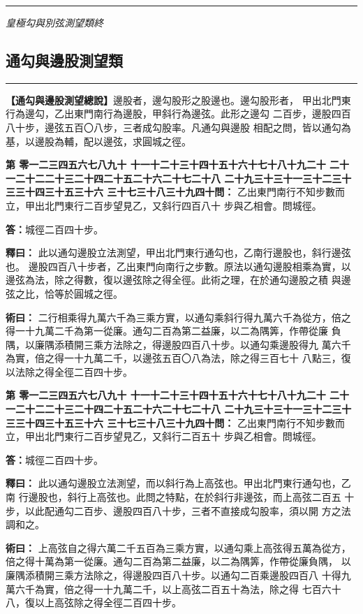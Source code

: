 \documentclass[11pt,a4paper]{article}
\newcommand{\longline}{\noindent\rule{\textwidth}{0.4pt}}
\newcounter{probnum}
\newcommand{\chnum}[1]{%
  \ifcase#1 零\or 一\or 二\or 三\or 四\or 五\or 六\or 七\or 八\or 九\or 十\or
    十一\or 十二\or 十三\or 十四\or 十五\or 十六\or 十七\or 十八\or 十九\or 二十\or
    二十一\or 二十二\or 二十三\or 二十四\or 二十五\or 二十六\or 二十七\or 二十八\or
    二十九\or 三十\or 三十一\or 三十二\or 三十三\or 三十四\or 三十五\or 三十六\or
    三十七\or 三十八\or 三十九\or 四十\fi}
\newcommand{\problem}[1]{\stepcounter{probnum}\par\noindent\textbf{第\chnum{\value{probnum}}問：}#1\par}
\newcommand{\answer}[1]{\par\noindent\textbf{答：}#1\par}
\newcommand{\shiyi}[1]{\par\noindent\textbf{釋曰：}#1\par}
\newcommand{\shuyue}[1]{\par\noindent\textbf{術曰：}#1\par}
\begin{document}
\vspace{0.5cm}
\longline
\begin{center}
\textit{皇極勾與別弦測望類終}
\end{center}

\newpage
\setcounter{probnum}{0}

\subsection*{通勾與邊股測望類}
\vspace{0.3cm}
\longline
\vspace{0.3cm}

\noindent
\textbf{【通勾與邊股測望總說】}邊股者，邊勾股形之股邊也。邊勾股形者，
甲出北門東行為邊勾，乙出東門南行為邊股，甲斜行為邊弦。此形之邊勾
二百步，邊股四百八十步，邊弦五百〇八步，三者成勾股率。凡通勾與邊股
相配之問，皆以通勾為基，以邊股為輔，配以邊弦，求圓城之徑。

\problem{
乙出東門南行不知步數而立，甲出北門東行二百步望見乙，又斜行四百八十
步與乙相會。問城徑。
}

\answer{城徑二百四十步。}

\shiyi{
此以通勾邊股立法測望，甲出北門東行通勾也，乙南行邊股也，斜行邊弦也。
邊股四百八十步者，乙出東門向南行之步數。原法以通勾邊股相乘為實，以
邊弦為法，除之得數，復以邊弦除之得全徑。此術之理，在於通勾邊股之積
與邊弦之比，恰等於圓城之徑。
}

\shuyue{
二行相乘得九萬六千為三乘方實，以通勾乘斜行得九萬六千為從方，倍之
得一十九萬二千為第一從廉。通勾二百為第二益廉，以二為隅筭，作帶從廉
負隅，以廉隅添積開三乘方法除之，得邊股四百八十步。以通勾乘邊股得九
萬六千為實，倍之得一十九萬二千，以邊弦五百〇八為法，除之得三百七十
八點三，復以法除之得全徑二百四十步。
}

\vspace{0.3cm}
\problem{
乙出東門南行不知步數而立，甲出北門東行二百步望見乙，又斜行二百五十
步與乙相會。問城徑。
}

\answer{城徑二百四十步。}

\shiyi{
此以通勾邊股立法測望，而以斜行為上高弦也。甲出北門東行通勾也，乙南
行邊股也，斜行上高弦也。此問之特點，在於斜行非邊弦，而上高弦二百五
十步，以此配通勾二百步、邊股四百八十步，三者不直接成勾股率，須以開
方之法調和之。
}

\shuyue{
上高弦自之得六萬二千五百為三乘方實，以通勾乘上高弦得五萬為從方，
倍之得十萬為第一從廉。通勾二百為第二益廉，以二為隅筭，作帶從廉負隅，
以廉隅添積開三乘方法除之，得邊股四百八十步。以通勾二百乘邊股四百八
十得九萬六千為實，倍之得一十九萬二千，以上高弦二百五十為法，除之得
七百六十八，復以上高弦除之得全徑二百四十步。
}
\end{document}
